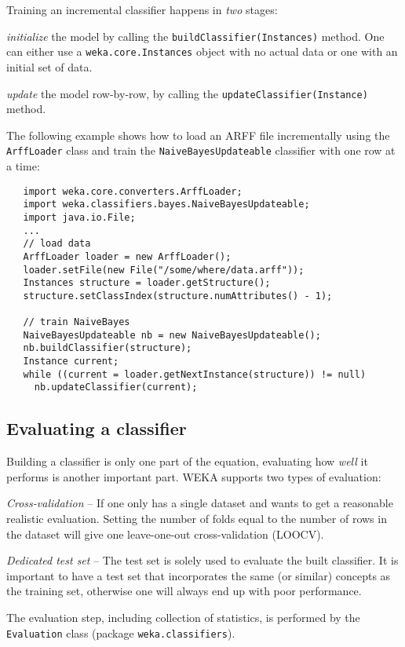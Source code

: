 Training an incremental classifier happens in \textit{two} stages:
\begin{tight_enumerate}
	\item \textit{initialize} the model by calling the
\texttt{buildClassifier(Instances)} method. One can either use a
\texttt{weka.core.Instances} object with no actual data or one with an initial
set of data.
	\item \textit{update} the model row-by-row, by calling the
\texttt{updateClassifier(Instance)} method.
\end{tight_enumerate}
The following example shows how to load an ARFF file incrementally using the
\texttt{ArffLoader} class and train the \texttt{NaiveBayesUpdateable} classifier
with one row at a time:
\begin{verbatim}
   import weka.core.converters.ArffLoader;
   import weka.classifiers.bayes.NaiveBayesUpdateable;
   import java.io.File;
   ...
   // load data
   ArffLoader loader = new ArffLoader();
   loader.setFile(new File("/some/where/data.arff"));
   Instances structure = loader.getStructure();
   structure.setClassIndex(structure.numAttributes() - 1);

   // train NaiveBayes
   NaiveBayesUpdateable nb = new NaiveBayesUpdateable();
   nb.buildClassifier(structure);
   Instance current;
   while ((current = loader.getNextInstance(structure)) != null)
     nb.updateClassifier(current);
\end{verbatim}

\newpage

\subsection{Evaluating a classifier}
Building a classifier is only one part of the equation, evaluating how
\textit{well} it performs is another important part. WEKA supports two types of
evaluation:
\begin{tight_itemize}
	\item \textit{Cross-validation} -- If one only has a single dataset and
wants to get a reasonable realistic evaluation. Setting the number of folds equal
to the number of rows in the dataset will give one leave-one-out
cross-validation (LOOCV).
	\item \textit{Dedicated test set} -- The test set is solely used to evaluate
the built classifier. It is important to have a test set that incorporates the
same (or similar) concepts as the training set, otherwise one will always end
up with poor performance.
\end{tight_itemize}
The evaluation step, including collection of statistics, is performed by the
\texttt{Evaluation} class (package \texttt{weka.classifiers}).

